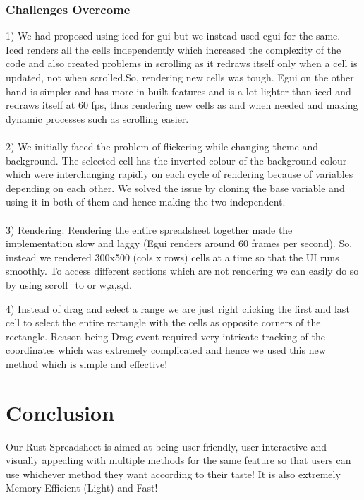 \documentclass{article}
\begin{document}
\subsubsection{Challenges Overcome}
\label{sec:limitations}
1) We had proposed using iced for gui but we instead used egui for the same. Iced renders all the cells independently which increased the complexity of the code and also created problems in scrolling as it redraws itself only when a cell is updated, not when scrolled.So, rendering new cells was tough. Egui on the other hand is simpler and has more in-built features and is a lot lighter than iced and redraws itself at 60 fps, thus rendering new cells as and when needed and making dynamic processes such as scrolling easier.
\\ \\
2) We initially faced the problem of flickering while changing theme and background. The selected cell has the inverted colour of the background colour which were interchanging rapidly on each cycle of rendering because of variables depending on each other. We solved the issue by cloning the base variable and using it in both of them and hence making the two independent.
\\ \\
3) Rendering: Rendering the entire spreadsheet together made the implementation slow and laggy (Egui renders around 60 frames per second). So, instead we rendered 300x500 (cols x rows) cells at a time so that the UI runs smoothly. To access different sections which are not rendering we can easily do so by using scroll\_to or w,a,s,d.

4) Instead of drag and select a range we are just right clicking the first and last cell to select the entire rectangle with the cells as opposite corners of the rectangle. Reason being Drag event required very intricate tracking of the coordinates which was extremely complicated and hence we used this new method which is simple and effective!
\section{Conclusion}
Our Rust Spreadsheet is aimed at being user friendly, user interactive and visually appealing with multiple methods for the same feature so that users can use whichever method they want according to their taste! It is also extremely Memory Efficient (Light) and Fast!

\appendix
\end{document}
